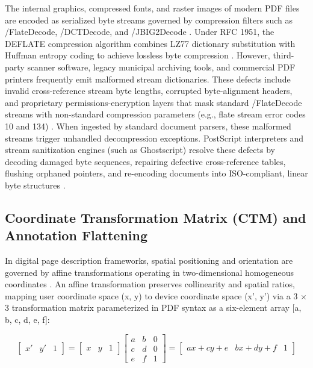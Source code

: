 The internal graphics, compressed fonts, and raster images of modern PDF files are encoded as serialized byte streams governed by compression filters such as /FlateDecode, /DCTDecode, and /JBIG2Decode \cite{ref12, ref14}.
Under RFC 1951, the DEFLATE compression algorithm combines LZ77 dictionary substitution with Huffman entropy coding to achieve lossless byte compression \cite{ref14}.
However, third-party scanner software, legacy municipal archiving tools, and commercial PDF printers frequently emit malformed stream dictionaries.
These defects include invalid cross-reference stream byte lengths, corrupted byte-alignment headers, and proprietary permissions-encryption layers that mask standard /FlateDecode streams with non-standard compression parameters (e.g., flate stream error codes 10 and 134) \cite{ref14, ref15}.
When ingested by standard document parsers, these malformed streams trigger unhandled decompression exceptions.
PostScript interpreters and stream sanitization engines (such as Ghostscript) resolve these defects by decoding damaged byte sequences, repairing defective cross-reference tables, flushing orphaned pointers, and re-encoding documents into ISO-compliant, linear byte structures \cite{ref15}.

\subsection{Coordinate Transformation Matrix (CTM) and Annotation Flattening}

In digital page description frameworks, spatial positioning and orientation are governed by affine transformations operating in two-dimensional homogeneous coordinates \cite{ref16, ref17}.
An affine transformation preserves collinearity and spatial ratios, mapping user coordinate space (x, y) to device coordinate space (x', y') via a 3 $\times$ 3 transformation matrix parameterized in PDF syntax as a six-element array [a, b, c, d, e, f]:

\begin{equation}
\label{eq:affine_ctm}
\begin{bmatrix} x' & y' & 1 \end{bmatrix} = \begin{bmatrix} x & y & 1 \end{bmatrix} \begin{bmatrix} a & b & 0 \\ c & d & 0 \\ e & f & 1 \end{bmatrix} = \begin{bmatrix} ax + cy + e & bx + dy + f & 1 \end{bmatrix}
\end{equation}

